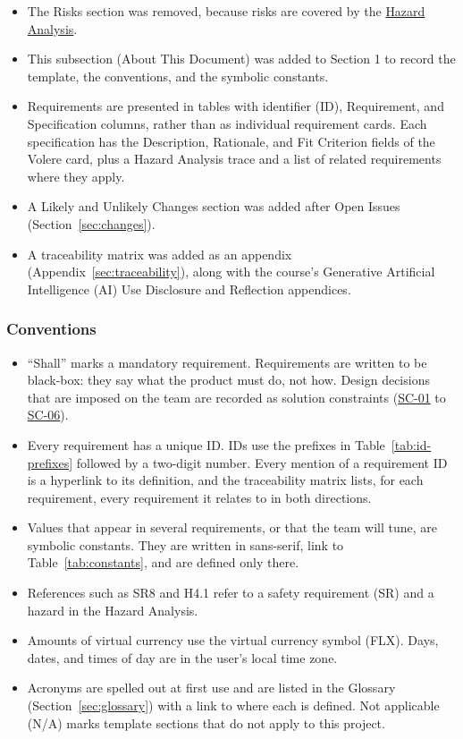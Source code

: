 \documentclass[12pt]{article}
\newcommand{\acr}[3]{\phantomsection\label{acr:#1}#2 (#3)}
\begin{document}
\begin{itemize}
  \item The Risks section was removed, because risks are covered by the
  \href{https://github.com/arjunkarthik123/fitness-finance-application/blob/main/pdfs/HazardAnalysis/HazardAnalysis.pdf}{Hazard
  Analysis}.
  \item This subsection (About This Document) was added to Section 1 to record
  the template, the conventions, and the symbolic constants.
  \item Requirements are presented in tables with \acr{ID}{identifier}{ID},
  Requirement, and Specification columns, rather than as individual requirement cards. Each specification has the
  Description, Rationale, and Fit Criterion fields of the Volere card, plus a
  Hazard Analysis trace and a list of related requirements where they apply.
  \item A Likely and Unlikely Changes section was added after Open Issues
  (Section~\ref{sec:changes}).
  \item A traceability matrix was added as an appendix
  (Appendix~\ref{sec:traceability}), along with the course's Generative
  \acr{AI}{Artificial Intelligence}{AI} Use Disclosure and Reflection appendices.
\end{itemize}

\subsubsection{Conventions}

\begin{itemize}
  \item ``Shall'' marks a mandatory requirement. Requirements are written to be
  black-box: they say what the product must do, not how. Design decisions that
  are imposed on the team are recorded as solution constraints (\hyperlink{req:SC-01}{SC-01} to \hyperlink{req:SC-06}{SC-06}).
  \item Every requirement has a unique ID. IDs use the prefixes in
  Table~\ref{tab:id-prefixes} followed by a two-digit number. Every mention of
  a requirement ID is a hyperlink to its definition, and the traceability
  matrix lists, for each requirement, every requirement it relates to in both
  directions.
  \item Values that appear in several requirements, or that the team will tune,
  are symbolic constants. They are written in \textsf{sans-serif}, link to
  Table~\ref{tab:constants}, and are defined only there.
  \item References such as SR8 and H4.1 refer to a
  \acr{SR}{safety requirement}{SR} and a hazard in the Hazard Analysis.
  \item Amounts of virtual currency use the \acr{FLX}{virtual currency symbol}{FLX}. Days, dates, and times
  of day are in the user's local time zone.
  \item Acronyms are spelled out at first use and are listed in the Glossary
  (Section~\ref{sec:glossary}) with a link to where each is defined.
  \acr{NA}{Not applicable}{N/A} marks template sections that do not apply to this project.
\end{itemize}
\end{document}
